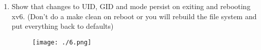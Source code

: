 \documentclass[11pt,letterpaper]{report}
\begin{document}
\begin{enumerate}
                                                                                                                                                                                                                                                                                                                                                                                                                                                                                                                                                                                                                                                                                                                                    \item Show that changes to UID, GID and mode persist on exiting and rebooting xv6. (Don't do a make clean on reboot or you will rebuild the file system and put everything back to defaults)
                                                                                                                                                                                                                                                                                                                                                                                                                                                                                                                                                                                                                                                                                                                                    \begin{figure}[h!]
                                                                                                                                                                                                                                                                                                                                                                                                                                                                                                                                                                                                                                                                                                                                    \centering
                                                                                                                                                                                                                                                                                                                                                                                                                                                                                                                                                                                                                                                                                                                                    \texttt{[image: ./6.png]}

\end{figure}
\end{enumerate}
\end{document}
